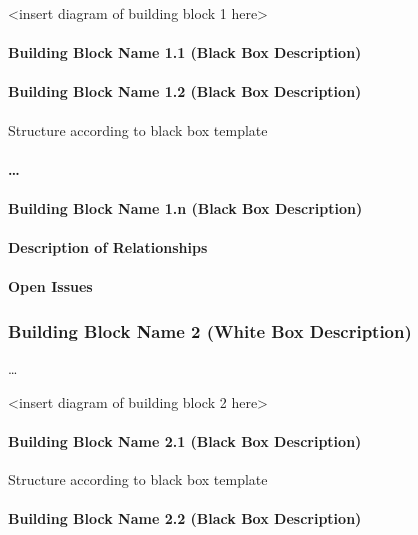 \documentclass[]{article}
\begin{document}
\textless{}insert diagram of building block 1 here\textgreater{}

\paragraph{Building Block Name 1.1 (Black Box Description)}

\paragraph{Building Block Name 1.2 (Black Box Description)}

Structure according to black box template

\paragraph{\ldots{}}

\paragraph{Building Block Name 1.n (Black Box Description)}

\paragraph{Description of Relationships}

\paragraph{Open Issues}

\subsubsection{Building Block Name 2 (White Box Description)}

\ldots{}

\textless{}insert diagram of building block 2 here\textgreater{}

\paragraph{Building Block Name 2.1 (Black Box Description)}

Structure according to black box template

\paragraph{Building Block Name 2.2 (Black Box Description)}
\end{document}

